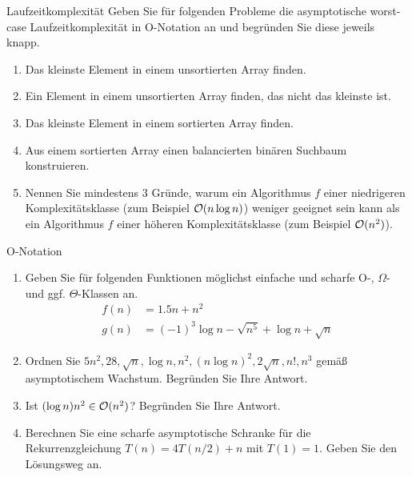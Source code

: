 \documentclass{article}
\begin{document}
\begin{exercise}{Laufzeitkomplexität}
  Geben Sie für folgenden Probleme die asymptotische worst-case Laufzeitkomplexität in O-Notation an und begründen Sie diese jeweils knapp.
  \begin{enumerate}
    \item Das kleinste Element in einem unsortierten Array finden.
    \item Ein Element in einem unsortierten Array finden, das nicht das kleinste ist.
    \item Das kleinste Element in einem sortierten Array finden.
    \item Aus einem sortierten Array einen balancierten binären Suchbaum konstruieren.
    \item Nennen Sie mindestens 3 Gründe, warum ein Algorithmus $f$ einer niedrigeren Komplexitätsklasse (zum Beispiel $\mathcal{O}(n \log n)$) weniger geeignet sein kann als ein Algorithmus $f$ einer höheren Komplexitätsklasse (zum Beispiel $\mathcal{O}(n^2)$).
  \end{enumerate}
\end{exercise}

\begin{exercise}{O-Notation}
  \begin{enumerate}
    \item Geben Sie für folgenden Funktionen möglichst einfache und scharfe O-, $\Omega$- und ggf. $\Theta$-Klassen an.
          \begin{align*}
            f(n) & = 1.5n + n^2                                     \\
            g(n) & = (-1)^3 \log n - \sqrt{n^5} + \log n + \sqrt{n}
          \end{align*}
    \item Ordnen Sie $5n^2, 28, \sqrt{n}, \log n, n^2, (n \log n)^2, 2\sqrt{n}, n!, n^3$ gemäß asymptotischem Wachstum. Begründen Sie Ihre Antwort.
    \item Ist $(\log n)n^2 \in \mathcal{O}(n^2)$? Begründen Sie Ihre Antwort.
    \item Berechnen Sie eine scharfe asymptotische Schranke für die Rekurrenzgleichung $T(n) = 4T(n/2) + n$ mit $T(1) = 1$. Geben Sie den Lösungsweg an.
  \end{enumerate}
\end{exercise}
\end{document}
